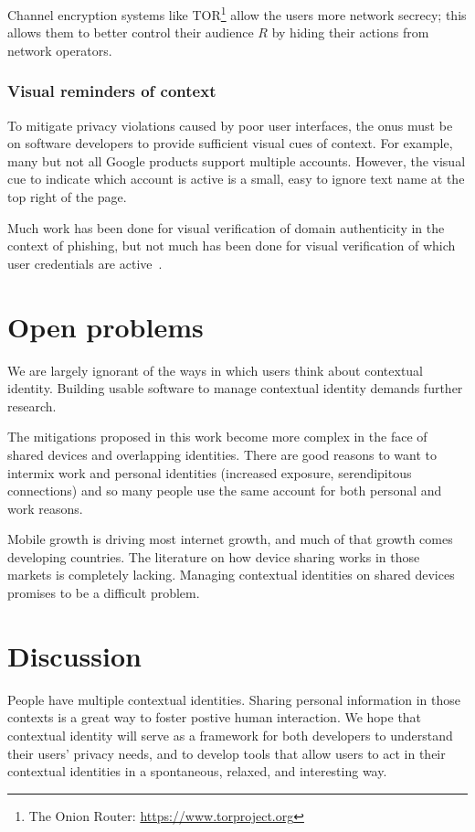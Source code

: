 \documentclass{llncs}
\begin{document}
Channel encryption systems like TOR\footnote{The Onion Router: \url{https://www.torproject.org}} allow the users more network secrecy; this allows them to better control their audience $R$ by hiding their actions from network operators.

\subsubsection{Visual reminders of context}
To mitigate privacy violations caused by poor user interfaces, the onus must be
on software developers to provide sufficient visual cues of context. For
example, many but not all Google products support multiple accounts. However,
the visual cue to indicate which account is active is a small, easy to ignore
text name at the top right of the page.

Much work has been done for visual verification of domain authenticity in the
context of phishing, but not much has been done for visual verification of
which user credentials are active~\cite{skins}.

\section{Open problems}
We are largely ignorant of the ways in which users think about contextual
identity. Building usable software to manage contextual identity demands
further research.

The mitigations proposed in this work become more complex in the face of shared
devices and overlapping identities. There are good reasons to want to intermix
work and personal identities (increased exposure, serendipitous connections)
and so many people use the same account for both personal and work reasons.

Mobile growth is driving most internet growth, and much of that growth comes
developing countries. The literature on how device sharing works in those
markets is completely lacking. Managing contextual identities on shared devices
promises to be a difficult problem.

\section{Discussion}
People have multiple contextual identities. Sharing personal information in
those contexts is a great way to foster postive human interaction.  We hope
that contextual identity will serve as a framework for both developers to
understand their users' privacy needs, and to develop tools that allow users to
act in their contextual identities in a spontaneous, relaxed, and interesting
way.
\end{document}

